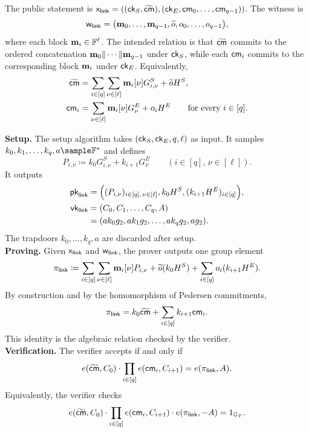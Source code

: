 The public statement is
\(\mathsf{x}_{\mathsf{link}}=(({\textsf{ck}}_S,\widetilde{\textsf{cm}}),
({\textsf{ck}}_E,\textsf{cm}_0,\ldots,\textsf{cm}_{q-1}))\).  The witness is
\[
  \mathsf{w}_{\mathsf{link}}
  =
  \big(
    \mathbf{m}_0,\ldots,\mathbf{m}_{q-1},
    \widetilde{o},
    o_0,\ldots,o_{q-1}
  \big),
\]
where each block \(\mathbf{m}_i\in\mathbb{F}^{\ell}\).  The intended relation is
that \(\widetilde{\textsf{cm}}\) commits to the ordered concatenation
\(\mathbf{m}_0\|\cdots\|\mathbf{m}_{q-1}\) under \({\textsf{ck}}_S\), while each
\(\textsf{cm}_i\) commits to the corresponding block \(\mathbf{m}_i\) under \({\textsf{ck}}_E\).
Equivalently,
\[
\begin{aligned}
  \widetilde{\textsf{cm}}
  &=
  \sum_{i\in[q]}\sum_{\nu\in[\ell]}
  \mathbf{m}_i[\nu]G^S_{i,\nu}
  +
  \widetilde{o}H^S, \\
  \textsf{cm}_i
  &=
  \sum_{\nu\in[\ell]}
  \mathbf{m}_i[\nu]G^E_{\nu}
  +
  o_iH^E
  \qquad \text{for every } i\in[q].
\end{aligned}
\]

\noindent\textbf{Setup.}
The setup algorithm takes \(({\textsf{ck}}_S,{\textsf{ck}}_E,q,\ell)\) as input.  It samples
\(k_0,k_1,\ldots,k_q,a\sample\mathbb{F}^{\ast}\) and defines
\[
  P_{i,\nu} \coloneqq k_0G^S_{i,\nu}+k_{i+1}G^E_{\nu}
  \qquad
  (i\in[q],\,\nu\in[\ell]).
\]
It outputs
\[
\begin{aligned}
  {\textsf{pk}}_{\mathsf{link}}
  &=
  \Big(
    (P_{i,\nu})_{i\in[q],\,\nu\in[\ell]},
    k_0H^S,
    (k_{i+1}H^E)_{i\in[q]}
  \Big), \\
  {\textsf{vk}}_{\mathsf{link}}
  &=
  (C_0,C_1,\ldots,C_q,A)
  \\
  &=
  (ak_0g_2,ak_1g_2,\ldots,ak_qg_2,ag_2).
\end{aligned}
\]
The trapdoors \(k_0,\ldots,k_q,a\) are discarded after setup. \\

\noindent\textbf{Proving.}
Given \(\mathsf{x}_{\mathsf{link}}\) and \(\mathsf{w}_{\mathsf{link}}\), the prover
outputs one group element
\[
\begin{aligned}
  \pi_{\mathsf{link}}
  \coloneqq
  \sum_{i\in[q]}\sum_{\nu\in[\ell]}
  \mathbf{m}_i[\nu]P_{i,\nu}
  +
  \widetilde{o}(k_0H^S)
  +
  \sum_{i\in[q]} o_i(k_{i+1}H^E).
\end{aligned}
\]
By construction and by the homomorphism of Pedersen commitments,
\[
  \pi_{\mathsf{link}}
  =
  k_0\widetilde{\textsf{cm}}
  +
  \sum_{i\in[q]} k_{i+1}\textsf{cm}_i .
\]
This identity is the algebraic relation checked by the verifier. \\

\noindent\textbf{Verification.}
The verifier accepts if and only if
\[
  e(\widetilde{\textsf{cm}},C_0)
  \cdot
  \prod_{i\in[q]} e(\textsf{cm}_i,C_{i+1})
  =
  e(\pi_{\mathsf{link}},A).
\]
Equivalently, the verifier checks
\[
  e(\widetilde{\textsf{cm}},C_0)
  \cdot
  \prod_{i\in[q]} e(\textsf{cm}_i,C_{i+1})
  \cdot
  e(\pi_{\mathsf{link}},-A)
  =
  1_{\mathbb{G}_T}.
\]

